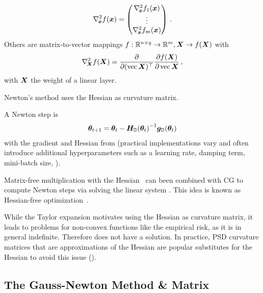 {\begin{align}
    \nabla_{\!{{\bm{x}}}}^{2} f({\bm{x}})
    =
    \begin{pmatrix}
      \nabla_{\!{{\bm{x}}}}^{2} f_1({\bm{x}})
      \\
      \vdots
      \\
      \nabla_{\!{{\bm{x}}}}^{2} f_m({\bm{x}})
    \end{pmatrix}\,.
  \end{align}
  Others are matrix-to-vector mappings $f:{\mathbb{R}}^{n\times q}\to {\mathbb{R}}^m, {\bm{X}}
  \to f({\bm{X}})$ with
  \begin{align*}
    \nabla_{\!{{\bm{X}}}}^{2} f({\bm{X}})
    =
    \frac{\partial}{\partial (\operatorname{vec} {\bm{X}})^\top}\frac{\partial f({\bm{X}})}{\partial \operatorname{vec} {\bm{X}}}\,,
  \end{align*}
  \eg with ${\bm{X}}$ the weight of a linear layer.%
}

Newton's method uses the Hessian as curvature matrix.

\begin{updaterule}\label{opt:background::Newton}
  A Newton step is
  \begin{align}
    {\bm{\theta}}_{t+1} = {\bm{\theta}}_t - {{\bm{H}}_{{\mathbb{D}}}({\bm{\theta}}_t)}^{-1} {\bm{g}}_{{\mathbb{D}}}({\bm{\theta}}_t)
  \end{align}
  with the gradient and Hessian from
   (practical
  implementations vary and often introduce additional hyperparameters such as a
  learning rate, damping term, mini-batch size, \etc).
\end{updaterule}

Matrix-free multiplication with the Hessian~\cite{pearlmutter1994fast} can been
combined with CG to compute Newton steps via solving the linear system
. This idea is known as
Hessian-free optimization~\cite{martens2010deep}.

While the Taylor expansion motivates using the Hessian as curvature matrix, it
leads to problems for non-convex functions like the empirical risk, as it is in
general indefinite. Therefore
 does not have a
solution. In practice, PSD curvature matrices that are approximations of the
Hessian are popular substitutes for the Hessian to avoid this issue
().

\subsection{The Gauss-Newton Method \& Matrix}\label{sec:background::gn}

